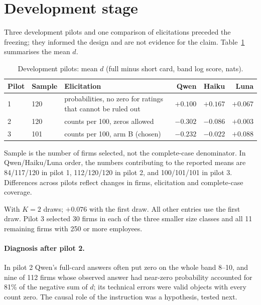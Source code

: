 \documentclass[11pt]{article}
\begin{document}
\section{Development stage}
\label{sec:dev}

Three development pilots and one comparison of elicitations preceded the freezing; they informed the design and are
not evidence for the claim. Table~\ref{tab:dev} summarises the mean $d$.

\begin{table}[ht]
\centering
\begin{threeparttable}
\caption{Development pilots: mean $d$ (full minus short card, band log score, nats).}
\label{tab:dev}
\small
\begin{tabular}{llp{6.0cm}rrr}
\toprule
Pilot & Sample & Elicitation & Qwen & Haiku & Luna\\
\midrule
1 & 120 & probabilities, no zero for ratings that cannot be ruled out & $+0.100$ & $+0.167$ & $+0.067$\\
2 & 120 & counts per 100, zeros allowed & $-0.302$ & $-0.086$ & $+0.003$\\
3 & 101 & counts per 100, arm B (chosen) & $-0.232$ & $-0.022$ & $+0.088$\tnote{a}\\
\bottomrule
\end{tabular}
\begin{tablenotes}\footnotesize
\item Sample is the number of firms selected, not the complete-case denominator. In Qwen/Haiku/Luna order,
the numbers contributing to the reported means are 84/117/120 in pilot 1, 112/120/120 in pilot 2, and 100/101/101
in pilot 3. Differences across pilots reflect changes in firms, elicitation and complete-case coverage.
\item[a] With $K=2$ draws; $+0.076$ with the first draw. All other entries use the first draw.
Pilot 3 selected 30 firms in each of the three smaller size classes and all 11 remaining firms with 250 or more employees.
\end{tablenotes}
\end{threeparttable}
\end{table}

\paragraph{Diagnosis after pilot 2.} In pilot 2 Qwen's full-card answers often put zero on the whole band 8--10, and
nine of 112 firms whose observed answer had near-zero probability accounted for 81\% of the negative sum of $d$; its
technical errors were valid objects with every count zero. The causal role of the instruction was a hypothesis, tested
next.
\end{document}
